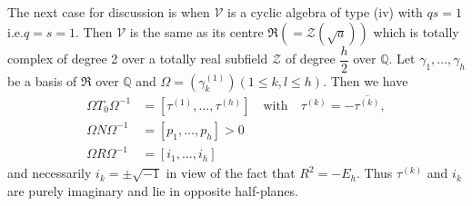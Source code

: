 The next case for discussion is when $\mathscr{V}$ is a cyclic algebra
of type (iv) with $qs=1$ i.e.\@ $q=s=1$. Then $\mathscr{V}$ is the
same as its centre $\mathfrak{R}(=\mathscr{Z}(\sqrt{a}))$ which is
totally complex of degree 2 over a totally real subfield $\mathscr{Z}$
of degree $\dfrac{h}{2}$ over $\mathbb{Q}$. Let
$\gamma_{1},\ldots,\gamma_{h}$ be a basis of $\mathfrak{R}$ over
$\mathbb{Q}$ and $\Omega=(\gamma^{(1)}_{k})(1\leq k,l\leq h)$. Then we
have 
\begin{align*}
\Omega T_{0} \Omega^{-1} &=
       [\tau^{(1)},\ldots,\tau^{(h)}]\quad\text{with}\quad
       \tau^{(k)}=-\overline{\tau^{(k)}},\\
\Omega N\Omega^{-1} &= [p_{1},\ldots,p_{h}]>0\\
\Omega R\Omega^{-1} &= [i_{1},\ldots,i_{h}]
\end{align*}\pageoriginale
and necessarily $i_{k}=\pm \sqrt{-1}$ in view of the fact that
$R^{2}=-E_{h}$. Thus $\tau^{(k)}$ and $i_{k}$ are purely imaginary and
lie in opposite half-planes.

